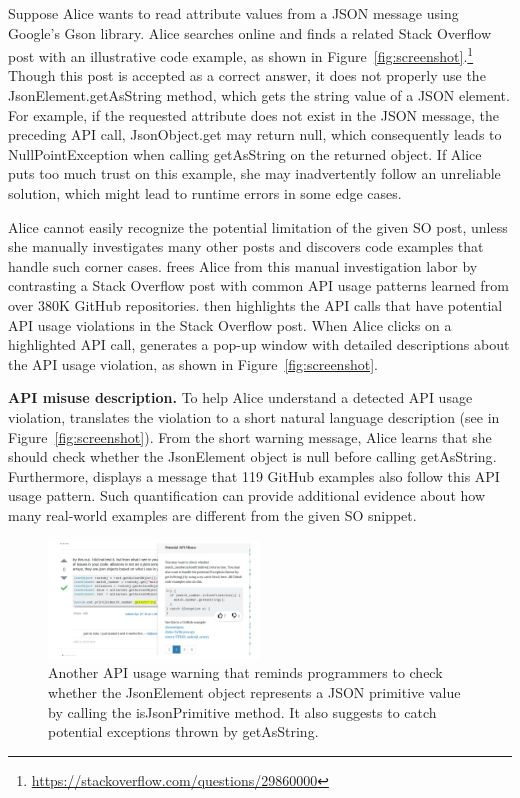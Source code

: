 Suppose Alice wants to read attribute values from a {\ttt JSON} message using Google's Gson library. Alice searches online and finds a related Stack Overflow post with an illustrative code example, as shown in Figure~\ref{fig:screenshot}.\footnote{\url{https://stackoverflow.com/questions/29860000}} Though this post is accepted as a correct answer, it does not properly use the {\ttt JsonElement.getAsString} method, which gets the {\ttt string} value of a {\ttt JSON} element. For example, if the requested attribute does not exist in the {\ttt JSON} message, the preceding API call, {\ttt JsonObject.get} may return {\ttt null}, which consequently leads to {\ttt NullPointException} when calling {\ttt getAsString} on the returned object. If Alice puts too much trust on this example, she may inadvertently follow an unreliable solution, which might lead to runtime errors in some edge cases. 

Alice cannot easily recognize the potential limitation of the given SO post, unless she manually investigates many other posts and discovers code examples that handle such corner cases. {\tool} frees Alice from this manual investigation labor by contrasting a Stack Overflow post with common API usage patterns learned from over 380K GitHub repositories. {\tool} then highlights the API calls that have potential API usage violations in the Stack Overflow post. When Alice clicks on a highlighted API call, {\tool} generates a pop-up window with detailed descriptions about the API usage violation, as shown in Figure~\ref{fig:screenshot}.

{\bf API misuse description.} To help Alice understand a detected API usage violation, {\tool} translates the violation to a short natural language description (see  in Figure~\ref{fig:screenshot}). From the short warning message, Alice learns that she should check whether the {\ttt JsonElement} object is {\ttt null} before calling {\ttt getAsString}. Furthermore, {\tool} displays a message that 119 GitHub examples also follow this API usage pattern. Such quantification can provide additional evidence about how many real-world examples are different from the given SO snippet.

\begin{figure}
\centering
\includegraphics[width=0.5\textwidth]{soap-v4-2.pdf}
  \caption{Another API usage warning that reminds programmers to check whether the {\ttt JsonElement} object represents a {\ttt JSON} primitive value by calling the {\ttt isJsonPrimitive} method. It also suggests to catch potential exceptions thrown by {\ttt getAsString}.}
  \label{fig:screenshot2}
\end{figure}

